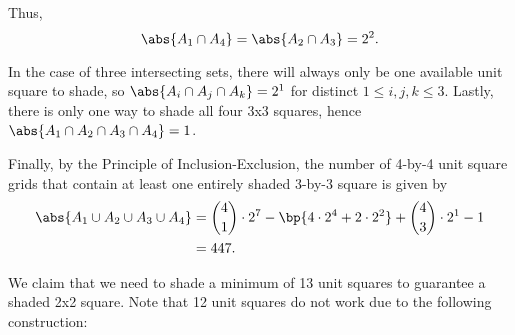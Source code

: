 \begin{solution}
\begin{ppart}
\begin{psubpart}
            Thus, \[\abs{A_1 \cap A_4} = \abs{A_2 \cap A_3} = 2^2.\]

            In the case of three intersecting sets, there will always only be one available unit square to shade, so $\abs{A_i \cap A_j \cap A_k} = 2^1$ for distinct $1 \leq i, j, k \leq 3$. Lastly, there is only one way to shade all four 3x3 squares, hence $\abs{A_1 \cap A_2 \cap A_3 \cap A_4} = 1$.

            Finally, by the Principle of Inclusion-Exclusion, the number of 4-by-4 unit square grids that contain at least one entirely shaded 3-by-3 square is given by
            \begin{align*}
                \abs{A_1 \cup A_2 \cup A_3 \cup A_4} &= \binom{4}{1} \cdot 2^7 - \bp{4 \cdot 2^4 + 2 \cdot 2^2} + \binom43 \cdot 2^1 - 1\\
                &= 447.
            \end{align*}
        \end{psubpart}
    \end{ppart}
    \begin{ppart}
        We claim that we need to shade a minimum of 13 unit squares to guarantee a shaded 2x2 square. Note that 12 unit squares do not work due to the following construction:

        \begin{center}
        \end{center}


\end{ppart}
\end{solution}
